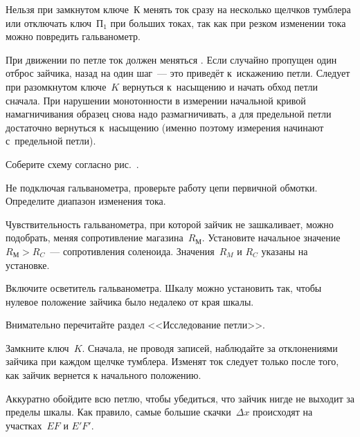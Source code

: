 Нельзя при замкнутом ключе~К менять ток сразу на несколько щелчков тумблера или
отключать ключ~$\text{П}_1$ при больших токах, так как при резком изменении
тока можно повредить гальванометр.

При движении по петле ток должен меняться .
Если случайно пропущен один отброс зайчика, 
назад на один шаг~--- это приведёт к~искажению петли. Следует при разомкнутом
ключе~$K$ вернуться к~насыщению и начать
обход петли сначала. При нарушении монотонности в измерении начальной кривой
намагничивания образец снова надо размагничивать, а для предельной петли
достаточно вернуться к~насыщению (именно поэтому измерения начинают с~предельной
петли).

\begin{lab:task}



	\item Соберите схему согласно рис.~.

	\item Не подключая гальванометра, проверьте работу цепи первичной обмотки.
Определите диапазон изменения тока.

	\item Чувствительность гальванометра, при которой зайчик не зашкаливает,
можно подобрать, меняя сопротивление
	магазина~$R_М$. Установите начальное значение~$R_М>R_C$~--- сопротивления
соленоида. Значения~$R_M$ и $R_C$ указаны на
	установке.

	Включите осветитель гальванометра. Шкалу можно установить так, чтобы нулевое
положение зайчика было недалеко от края шкалы.

	\begin{lab:warning}
		Внимательно перечитайте раздел <<Исследование петли>>.
	\end{lab:warning}

	\item Замкните ключ~$K$. Сначала, не проводя записей, наблюдайте за
отклонениями зайчика при каждом щелчке тумблера. Изменят ток следует только
после того, как зайчик вернется к начального положению.

	Аккуратно обойдите всю петлю, чтобы убедиться, что зайчик нигде не выходит
за пределы шкалы. Как правило, самые большие
	скачки~$\Delta x$ происходят на участках~$EF$ и $E'F'$.


\end{lab:task}
